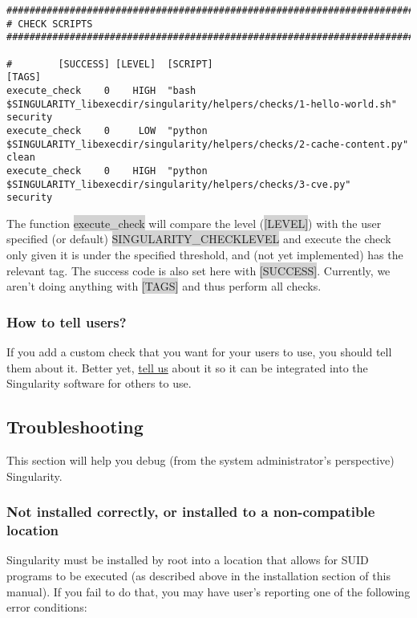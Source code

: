 \documentclass[a4paper]{article}
\begin{document}
\begin{lstlisting}[frame=single]
##################################################################################
# CHECK SCRIPTS
##################################################################################

#        [SUCCESS] [LEVEL]  [SCRIPT]                                                                         [TAGS]
execute_check    0    HIGH  "bash $SINGULARITY_libexecdir/singularity/helpers/checks/1-hello-world.sh"       security
execute_check    0     LOW  "python $SINGULARITY_libexecdir/singularity/helpers/checks/2-cache-content.py"   clean
execute_check    0    HIGH  "python $SINGULARITY_libexecdir/singularity/helpers/checks/3-cve.py"             security

\end{lstlisting}

The function \colorbox{lightgray}{execute\_check} will compare the level (\colorbox{lightgray}{[LEVEL]}) with the user specified (or default) \colorbox{lightgray}{SINGULARITY\_CHECKLEVEL} and execute the check only given it is under the specified threshold, and (not yet implemented) has the relevant tag. The success code is also set here with \colorbox{lightgray}{[SUCCESS]}. Currently, we aren’t doing anything with \colorbox{lightgray}{[TAGS]} and thus perform all checks.

\subsubsection{How to tell users?}

If you add a custom check that you want for your users to use, you should tell them about it. Better yet, \href{https://github.com/sylabs/singularity/issues}{tell us}  about it so it can be integrated into the Singularity software for others to use.

\subsection{Troubleshooting}

This section will help you debug (from the system administrator’s perspective) Singularity.

\subsubsection{Not installed correctly, or installed to a non-compatible location}

Singularity must be installed by root into a location that allows for SUID programs to be executed (as described above in the installation section of this manual). If you fail to do that, you may have user’s reporting one of the following error conditions:\\[0.1in]
\end{document}
